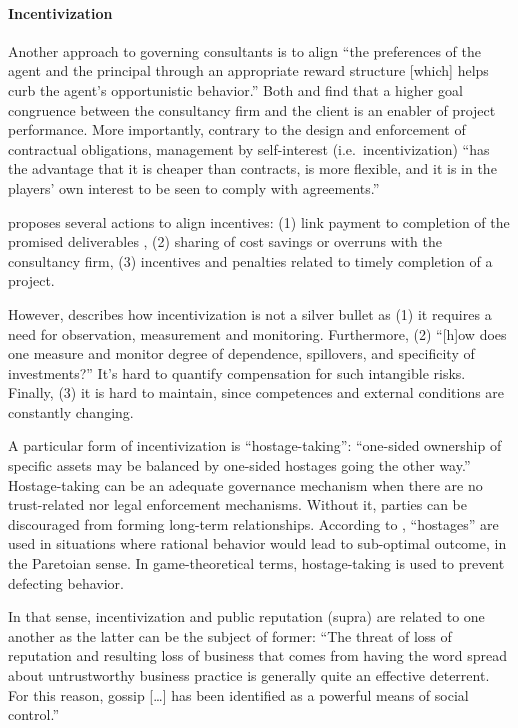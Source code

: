 \documentclass[12pt]{article}
\begin{document}
\paragraph{Incentivization}\label{incentivization}

Another approach to governing consultants is to align ``the preferences
of the agent and the principal through an appropriate reward structure
{[}which{]} helps curb the agent's opportunistic behavior.'' \citep[
13]{basu2011} Both \citet[264-266]{liberatore2010} and
\citet[597]{tosi1997} find that a higher goal congruence between the
consultancy firm and the client is an enabler of project performance.
More importantly, contrary to the design and enforcement of contractual
obligations, management by self-interest (i.e.~incentivization) ``has
the advantage that it is cheaper than contracts, is more flexible, and
it is in the players' own interest to be seen to comply with
agreements.'' \citep[ 924]{nooteboom2000}

\citet[15]{basu2011} proposes several actions to align incentives: (1)
link payment to completion of the promised deliverables \citep[see
also][ 243]{clark1993}, (2) sharing of cost savings or overruns with the
consultancy firm, (3) incentives and penalties related to timely
completion of a project.

However, \citet[924]{noteboom2000} describes how incentivization is not
a silver bullet as (1) it requires a need for observation, measurement
and monitoring. Furthermore, (2) ``{[}h{]}ow does one measure and
monitor degree of dependence, spillovers, and specificity of
investments?'' It's hard to quantify compensation for such intangible
risks. Finally, (3) it is hard to maintain, since competences and
external conditions are constantly changing.

A particular form of incentivization is ``hostage-taking'': ``one-sided
ownership of specific assets may be balanced by one-sided hostages going
the other way.''\citep[ 924]{nooteboom2000} Hostage-taking can be an
adequate governance mechanism when there are no trust-related nor legal
enforcement mechanisms. Without it, parties can be discouraged from
forming long-term relationships. According to \citet[47-48]{werner1993},
``hostages'' are used in situations where rational behavior would lead
to sub-optimal outcome, in the Paretoian sense. In game-theoretical
terms, hostage-taking is used to prevent defecting behavior.

In that sense, incentivization and public reputation (supra) are related
to one another as the latter can be the subject of former: ``The threat
of loss of reputation and resulting loss of business that comes from
having the word spread about untrustworthy business practice is
generally quite an effective deterrent. For this reason, gossip
{[}\ldots{]} has been identified as a powerful means of social
control.'' \citep[ 368]{shapiro1992}
\end{document}
